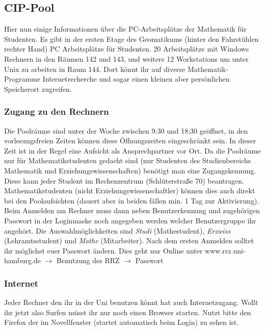 \subsection{CIP-Pool}

Hier nun einige Informationen über die PC-Arbeitsplätze der Mathematik für
Studenten. Es gibt in der ersten Etage des Geomatikums (hinter den Fahrstühlen
rechter Hand) PC Arbeitsplätze für Studenten. 20 Arbeitsplätze mit Windows
Rechnern in den Räumen 142 und 143, und weitere 12 Workstations um unter Unix
zu arbeiten in Raum 144. Dort könnt ihr auf diverse Mathematik-Programme
Internetrecherche und sogar einen kleinen aber persönlichen Speicherort
zugreifen.

\subsubsection{Zugang zu den Rechnern}

Die Poolräume sind unter der Woche zwischen 9:30 und 18:30 geöffnet, in den
vorlesungsfreien Zeiten können diese Öffnungszeiten eingeschränkt sein. In
dieser Zeit ist in der Regel eine Aufsicht als Ansprechpartner vor Ort. Da die
Poolräume nur für Mathematikstudenten gedacht sind (nur Studenten des
Studienbereichs Mathematik und Erziehungswissenschaften) benötigt man eine
Zugangskennung. Diese kann jeder Student im Rechenzentrum (Schlüterstraße 70)
beantragen. Mathematikstudenten (nicht Erziehungswissenschaftler) können dies
auch direkt bei den Poolaufsichten (dauert aber in beiden fällen min. 1 Tag zur
Aktivierung). Beim Anmelden am Rechner muss dann neben Benutzerkennung und
zugehörigen Passwort in der Loginmaske noch angegeben werden welcher
Benutzergruppe ihr angehört. Die Auswahlmöglichkeiten sind \emph{Studi}
(Mathestudent), \emph{Erzwiss} (Lehramtsstudent) und \emph{Mathe}
(Mitarbeiter). Nach dem ersten Anmelden solltet ihr möglichst euer Passwort
ändern. Dies geht nur Online unter www.rrz.uni-hamburg.de $\rightarrow$
Benutzung des RRZ $\rightarrow$ Passwort

\subsubsection{Internet}

Jeder Rechner den ihr in der Uni benutzen könnt hat auch Internetzugang. Wollt
ihr jetzt also Surfen müsst ihr nur noch einen Browser starten. Nutzt bitte den
Firefox der im Novellfenster (startet automatisch beim Login) zu sehen ist.



